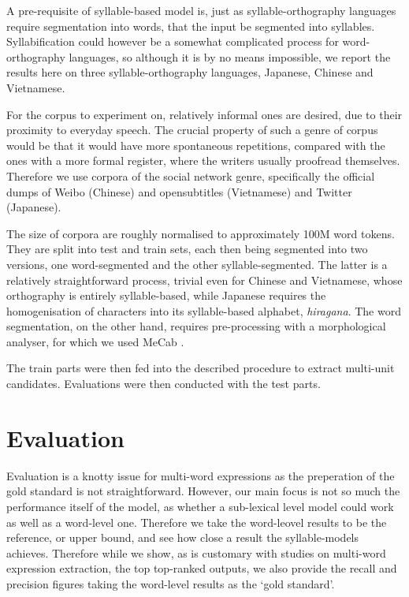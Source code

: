\documentclass{article}
\begin{document}
A pre-requisite of syllable-based model is, just as syllable-orthography languages require segmentation into words, that the input be segmented into syllables. Syllabification could however be a somewhat complicated process for word-orthography languages, so although it is by no means impossible, we report the results here on three syllable-orthography languages, Japanese, Chinese and Vietnamese.

For the corpus to experiment on, relatively informal ones are desired, due to their proximity to everyday speech. The crucial property of such a genre of corpus would be that it would have more spontaneous repetitions, compared with the ones with a more formal register, where the writers usually proofread themselves. Therefore we use corpora of the social network genre, specifically the official dumps of Weibo (Chinese) and opensubtitles (Vietnamese)  and Twitter (Japanese).

The size of corpora are roughly normalised to approximately 100M word tokens. They are split into test and train sets, each then being segmented into two versions, one word-segmented and the other syllable-segmented. The latter is a relatively straightforward process, trivial even for Chinese and Vietnamese, whose orthography is entirely syllable-based, while Japanese requires the homogenisation of characters into its syllable-based alphabet, \emph{hiragana}. The word segmentation, on the other hand, requires pre-processing with a morphological analyser, for which we used MeCab \cite{KudoEtAl04}.

The train parts were then fed into the described procedure to extract multi-unit candidates. Evaluations were then conducted with the test parts.


\section{Evaluation}

Evaluation is a knotty issue for multi-word expressions as the preperation of the gold standard is not straightforward. However, our main focus is not so much the performance itself of the model, as whether a sub-lexical level model could work as well as a word-level one. Therefore we take the word-leovel results to be the reference, or upper bound, and see how close a result the syllable-models achieves. Therefore while we show, as is customary with studies on multi-word expression extraction, the top top-ranked outputs, we also provide the recall and precision figures taking the word-level results as the `gold standard'. 
\end{document}
